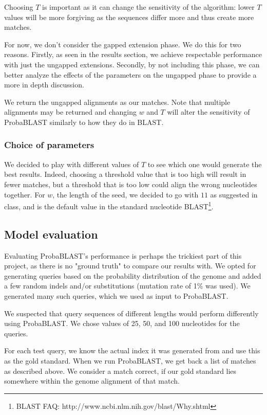\documentclass[11pt]{IEEEtran}
\begin{document}
Choosing $T$ is important as it can change the sensitivity of the algorithm: lower $T$ values will be more forgiving as the sequences differ more and thus create more matches.

For now, we don't consider the gapped extension phase. We do this for two reasons. Firstly, as seen in the results section, we achieve respectable performance with just the ungapped extensions. Secondly, by not including this phase, we can better analyze the effects of the parameters on the ungapped phase to provide a more in depth discussion.

We return the ungapped alignments as our matches. Note that multiple alignments may be returned and changing $w$ and $T$ will alter the sensitivity of ProbaBLAST similarly to how they do in BLAST.

\subsubsection{Choice of parameters}

We decided to play with different values of $T$ to see which one would generate the best results. Indeed, choosing a threshold value that is too high will result in fewer matches, but a threshold that is too low could align the wrong nucleotides together.
For $w$, the length of the seed, we decided to go with $11$ as suggested in class, and is the default value in the standard nucleotide BLAST\footnote{BLAST FAQ: http://www.ncbi.nlm.nih.gov/blast/Why.shtml}.

\subsection{Model evaluation}

Evaluating ProbaBLAST's performance is perhaps the trickiest part of this project, as there is no "ground truth" to compare our results with. We opted for generating queries based on the probability distribution of the genome and added a few random indels and/or substitutions (mutation rate of 1\% was used). We generated many such queries, which we used as input to ProbaBLAST.

We suspected that query sequences of different lengths would perform differently using ProbaBLAST. We chose values of 25, 50, and 100 nucleotides for the queries. 

For each test query, we know the actual index it was generated from and use this as the gold standard. When we run ProbaBLAST, we get back a list of matches as described above. We consider a match correct, if our gold standard lies somewhere within the genome alignment of that match.
\end{document}

